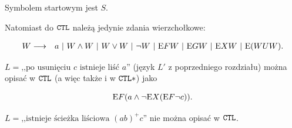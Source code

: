 Symbolem startowym jest $S$.

Natomiast do $\mathtt{CTL}$ należą jedynie zdania wierzchołkowe:

\begin{eqnarray*}
	W & \longrightarrow & a\ |\ W \land W\ |\ W \lor W\ |\ \neg W\ |\ \mathrm{E} FW\ |\ \mathrm{E} GW\ |\ \mathrm{E} XW\ |\ \mathrm{E} (WUW).
\end{eqnarray*}

\begin{przyklad}
	$L = \textrm{,,po usunięciu $c$ istnieje liść $a$''}$ (język $L'$ z poprzedniego rozdziału) można opisać w $\mathtt{CTL}$ (a więc także i w $\mathtt{CTL*}$) jako

	$$\mathrm{E} F(a \land \neg \mathrm{E} X (\mathrm{E} F \neg c)).$$
\end{przyklad}

\begin{przyklad}
	$L = \textrm{,,istnieje ścieżka liściowa $(ab)^{+}c$''}$ nie można opisać w $\mathtt{CTL}$.
\end{przyklad}


